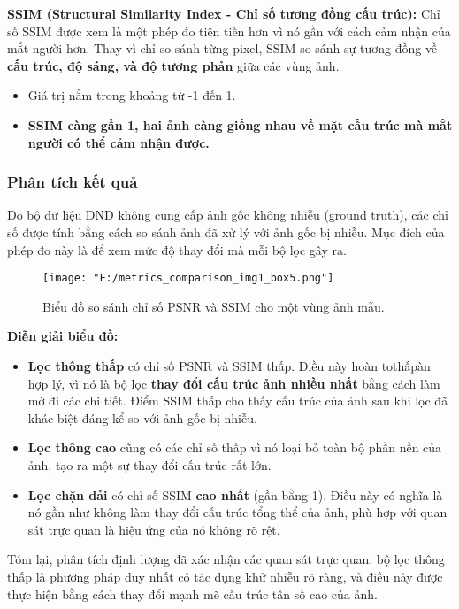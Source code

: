 \documentclass[12pt, a4paper]{article}
\begin{document}
	\textbf{SSIM (Structural Similarity Index - Chỉ số tương đồng cấu trúc):} Chỉ số SSIM được xem là một phép đo tiên tiến hơn vì nó gần với cách cảm nhận của mắt người hơn. Thay vì chỉ so sánh từng pixel, SSIM so sánh sự tương đồng về \textbf{cấu trúc, độ sáng, và độ tương phản} giữa các vùng ảnh.
	\begin{itemize}
		\item Giá trị nằm trong khoảng từ -1 đến 1.
		\item \textbf{SSIM càng gần 1, hai ảnh càng giống nhau về mặt cấu trúc mà mắt người có thể cảm nhận được.}
	\end{itemize}
	
	\subsubsection{Phân tích kết quả}
	Do bộ dữ liệu DND không cung cấp ảnh gốc không nhiễu (ground truth), các chỉ số được tính bằng cách so sánh ảnh đã xử lý với ảnh gốc bị nhiễu. Mục đích của phép đo này là để xem mức độ thay đổi mà mỗi bộ lọc gây ra.
	
	\begin{figure}[H]
		\centering
		\texttt{[image: "F:/metrics\_comparison\_img1\_box5.png"]}
		\caption{Biểu đồ so sánh chỉ số PSNR và SSIM cho một vùng ảnh mẫu.}
		\label{fig:metrics_chart}
	\end{figure}
	
\textbf{Diễn giải biểu đồ:}
\begin{itemize}
	\item \textbf{Lọc thông thấp} có chỉ số PSNR và SSIM thấp. Điều này hoàn tothấpàn hợp lý, vì nó là bộ lọc \textbf{thay đổi cấu trúc ảnh nhiều nhất} bằng cách làm mờ đi các chi tiết. Điểm SSIM thấp cho thấy cấu trúc của ảnh sau khi lọc đã khác biệt đáng kể so với ảnh gốc bị nhiễu.
	
	\item \textbf{Lọc thông cao} cũng có các chỉ số thấp vì nó loại bỏ toàn bộ phần nền của ảnh, tạo ra một sự thay đổi cấu trúc rất lớn.
	
	\item \textbf{Lọc chặn dải} có chỉ số SSIM \textbf{cao nhất} (gần bằng 1). Điều này có nghĩa là nó gần như không làm thay đổi cấu trúc tổng thể của ảnh, phù hợp với quan sát trực quan là hiệu ứng của nó không rõ rệt.
\end{itemize}
Tóm lại, phân tích định lượng đã xác nhận các quan sát trực quan: bộ lọc thông thấp là phương pháp duy nhất có tác dụng khử nhiễu rõ ràng, và điều này được thực hiện bằng cách thay đổi mạnh mẽ cấu trúc tần số cao của ảnh.
\end{document}
